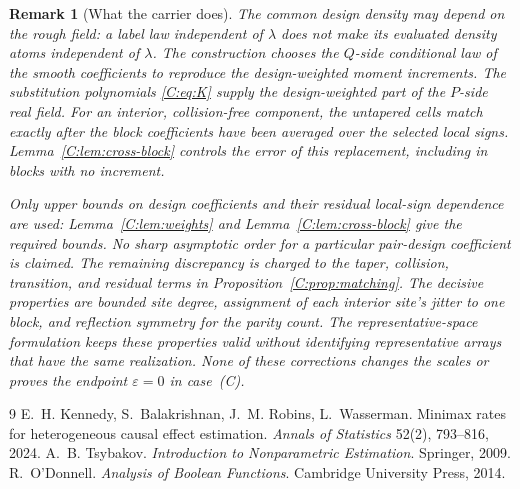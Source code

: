 \documentclass[11pt]{article}
\newtheorem{remark}[remark]{Remark}
\begin{document}
\begin{remark}[What the carrier does]
The common design density may depend on the rough field: a label law
independent of \(\lambda\) does not make its evaluated density atoms
independent of \(\lambda\).  The construction chooses the \(Q\)-side
conditional law of the smooth coefficients to reproduce the
\emph{design-weighted} moment increments.  The substitution polynomials
\eqref{C:eq:K} supply the design-weighted part of the \(P\)-side real
field.  For an interior, collision-free component, the untapered cells
match exactly after the block coefficients have been averaged over the
selected local signs.  Lemma~\ref{C:lem:cross-block} controls the error
of this replacement, including in blocks with no increment.

Only upper bounds on design coefficients and their residual local-sign
dependence are used: Lemma~\ref{C:lem:weights} and
Lemma~\ref{C:lem:cross-block} give the required bounds.  No sharp
asymptotic order for a particular pair-design coefficient is claimed.
The remaining discrepancy is charged to the taper, collision,
transition, and residual terms in Proposition~\ref{C:prop:matching}.
The decisive properties are bounded site degree, assignment of each
interior site's jitter to one block, and reflection symmetry for the
parity count.  The representative-space formulation keeps these
properties valid without identifying representative arrays that have
the same realization.  None of these corrections changes the scales
or proves the endpoint \(\varepsilon=0\) in case~(C).
\end{remark}


\begin{thebibliography}{9}
 E.~H. Kennedy, S.~Balakrishnan, J.~M. Robins, L.~Wasserman.
Minimax rates for heterogeneous causal effect estimation.
\emph{Annals of Statistics} 52(2), 793--816, 2024.
 A.~B. Tsybakov. \emph{Introduction to Nonparametric
Estimation}. Springer, 2009.
 R.~O'Donnell. \emph{Analysis of Boolean Functions}.
Cambridge University Press, 2014.
\end{thebibliography}
\end{document}
